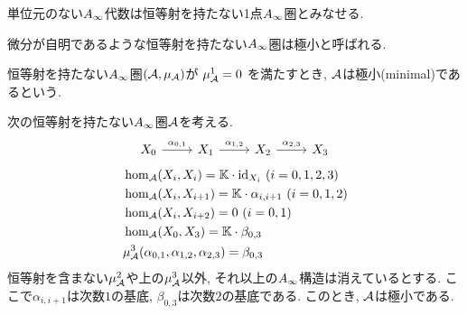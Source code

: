 \documentclass[uplatex, a4paper, 14Q, dvipdfmx]{jsarticle}
\begin{document}

\begin{example}
  単位元のない$A_{\infty}$代数は恒等射を持たない1点$A_{\infty}$圏とみなせる. 
\end{example}

微分が自明であるような恒等射を持たない$A_{\infty}$圏は極小と呼ばれる.

\begin{definition}
  恒等射を持たない$A_{\infty}$圏$(\mathcal{A},\mu_{\mathcal{A}})$が
  $\mu^1_{\mathcal{A}} = 0$
  を満たすとき, $\mathcal{A}$は極小(minimal)であるという. 
\end{definition}


\begin{example}
  次の恒等射を持たない$A_{\infty}$圏$\mathcal{A}$を考える. 
  \[\begin{tikzcd}
    {X_0} & {X_1} & {X_2} & {X_3}
    \arrow["{\alpha_{0,1}}", from=1-1, to=1-2]
    \arrow["{\alpha_{1,2}}", from=1-2, to=1-3]
    \arrow["{\alpha_{2,3}}", from=1-3, to=1-4]
  \end{tikzcd}\]
  \begin{align*}
    &\hom_{\mathcal{A}}(X_i,X_i) = \mathbb{K} \cdot \mathrm{id}_{X_i} ~ (i=0,1,2,3) \\
    &\hom_{\mathcal{A}}(X_i,X_{i+1}) = \mathbb{K} \cdot \alpha_{i,i+1} ~ (i=0,1,2) \\
    &\hom_{\mathcal{A}}(X_i,X_{i+2}) = 0 ~ (i=0,1) \\
    &\hom_{\mathcal{A}}(X_0,X_3) = \mathbb{K} \cdot \beta_{0,3} \\
    &\mu_{\mathcal{A}}^3(\alpha_{0,1},\alpha_{1,2},\alpha_{2,3}) = \beta_{0,3}
  \end{align*}
  恒等射を含まない$\mu^2_{\mathcal{A}}$や上の$\mu_{\mathcal{A}}^3$以外, それ以上の$A_{\infty}$構造は消えているとする. 
  ここで$\alpha_{i,i+1}$は次数$1$の基底, $\beta_{0,3}$は次数$2$の基底である. 
  このとき, $\mathcal{A}$は極小である. 
\end{example}
\end{document}

